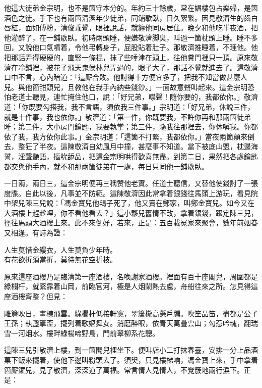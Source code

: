 他這大徒弟金宗明，也不是箇守本分的。年約三十餘歲，常在娼樓包占樂婦，是箇酒色之徒。手下也有兩箇清潔年少徒弟，同鋪歇臥，日久絮繁。{}因見敬濟生的齒白唇紅，面如傅粉，清俊乖覺，眼裡說話，就纏他同房居住。晚夕和他吃半夜酒，把他灌醉了，在一鋪歇臥。初時兩頭睡，便嫌敬濟脚臭，叫過一箇枕頭上睡。睡不多回，又說他口氣噴着，令他弔轉身子，屁股貼着肚子。那敬濟推睡着，不理他。他把那話弄得硬硬的，直豎一條棍，抹了些唾津在頭上，往他糞門裡只一頂。原來敬濟在冷鋪裡，被花子飛天鬼侯林兒弄過的，眼子大了，那話不覺就進去了。{}這敬濟口中不言，心內暗道：「這厮合敗。他討得十方便宜多了，把我不知當做甚麼人兒。與他箇甜頭兒，且教他在我手內納些錢鈔。」一面故意聲叫起來。這金宗明恐怕老道士聽見，連忙掩住他口，說：「好兄弟，噤聲！隨你要的，我都依你。」敬濟道：「你既要勾搭我，我不言語，須依我三件事。」{}宗明道：「好兄弟，休說三件，就是十件事，我也依你。」敬濟道：「第一件，你既要我，不許你再和那兩箇徒弟睡；第二件，大小房門鑰匙，我要執掌；第三件，隨我往那裡去，你休嗔我。你都依了我，我方依你此事。」金宗明道：「這箇不打緊，我都依你。」當夜兩箇顛來倒去，整狂了半夜。這陳敬濟自幼風月中撞，甚麼事不知道。當下被底山盟，枕邊海誓，淫聲艷語，摳吮舔品，{}把這金宗明哄得歡喜無盡。到第二日，果然把各處鑰匙都交與他手內，就不和那兩箇徒弟在一處，每日只同他一鋪歇臥。

一日兩，兩日三，這金宗明便再三稱赞他老實。任道士聽信，又替他使錢討了一張度牒。自此以後，凡事並不防範。這陳敬濟因此常拿着銀錢往馬頭上游玩，看見院中架兒陳三兒說：「馮金寶兒他鴇子死了，他又賣在鄭家，叫鄭金寶兒。如今又在大酒樓上趕趁哩，你不看他看去？」這小夥兒舊情不改，拿着銀錢，跟定陳三兒，徑往馬頭大酒樓上來。此不來倒好，若來，正是：五百載冤家來聚會，數年前姻眷又相逢。有詩為證：

\begin{myquote}
人生莫惜金縷衣，人生莫負少年時。\\有花欲折須當折，莫待無花空折枝。
\end{myquote}

原來這座酒樓乃是臨清第一座酒樓，名喚謝家酒樓。裡面有百十座閣兒，周圍都是綠欄杆，就緊靠着山岡，前臨官河，極是人烟鬧熱去處，舟船往來之所。怎見得這座酒樓齊整？但見：

\begin{myquote}
雕簷映日，畫棟飛雲。綠欄杆低接軒窻，翠簾櫳高懸戶牖。吹笙品笛，盡都是公子王孫；執盞擎盃，擺列着歌嫗舞女。消磨醉眼，依青天萬疊雲山；勾惹吟魂，翻瑞雪一河烟水。樓畔綠楊啼野鳥，門前翠柳系花驄。
\end{myquote}

這陳三兒引敬濟上樓，到一箇閣兒裡坐下。便叫店小二打抹春臺，安排一分上品酒菓下飯來擺着，使他下邊叫粉頭去了。須臾，只見樓梯响，馮金寶上來，手中拿着箇厮鑼兒，見了敬濟，深深道了萬福。常言情人見情人，不覺簇地兩行淚下。{}正是：

